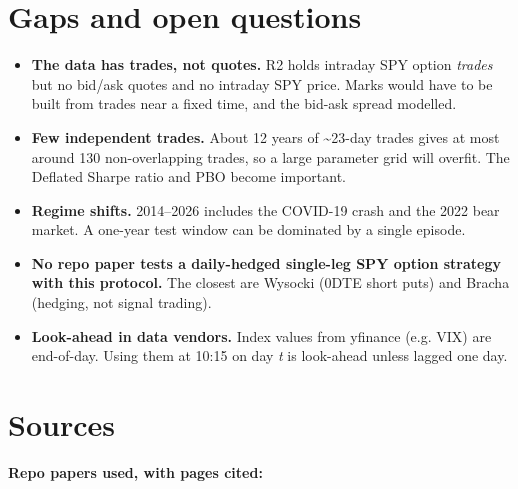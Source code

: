 \documentclass{article}
\begin{document}
\section{Gaps and open questions}

\begin{itemize}

\item \textbf{The data has trades, not quotes.} R2 holds intraday SPY option \emph{trades} but no bid/\allowbreak{}ask quotes and no intraday SPY price. Marks would have to be built from trades near a fixed time, and the bid-ask spread modelled.

\item \textbf{Few independent trades.} About 12 years of \textasciitilde{}23-day trades gives at most around 130 non-overlapping trades, so a large parameter grid will overfit. The Deflated Sharpe ratio and PBO become important.

\item \textbf{Regime shifts.} 2014--2026 includes the COVID-19 crash and the 2022 bear market. A one-year test window can be dominated by a single episode.

\item \textbf{No repo paper tests a daily-hedged single-leg SPY option strategy with this protocol.} The closest are Wysocki (0DTE short puts) and Bracha (hedging, not signal trading).

\item \textbf{Look-ahead in data vendors.} Index values from yfinance (e.g. VIX) are end-of-day. Using them at 10:15 on day \emph{t} is look-ahead unless lagged one day.

\end{itemize}

\section{Sources}

\textbf{Repo papers used, with pages cited:}
\end{document}
